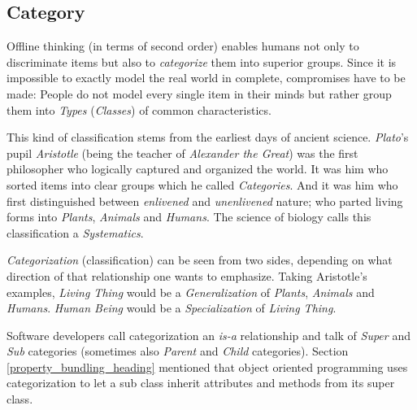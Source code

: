 %
%
%
%
%
%
%

\subsection{Category}
\label{category_heading}

Offline thinking (in terms of second order) enables humans not only to
discriminate items but also to \emph{categorize} them into superior groups.
Since it is impossible to exactly model the real world in complete, compromises
have to be made: People do not model every single item in their minds but rather
group them into \emph{Types} (\emph{Classes}) of common characteristics.

This kind of classification stems from the earliest days of ancient science.
\emph{Plato}'s pupil \emph{Aristotle} (being the teacher of \emph{Alexander the
Great}) was the first philosopher who logically captured and organized the world.
It was him who sorted items into clear groups which he called \emph{Categories}.
And it was him who first distinguished between \emph{enlivened} and
\emph{unenlivened} nature; who parted living forms into \emph{Plants},
\emph{Animals} and \emph{Humans}. The science of biology calls this classification
a \emph{Systematics}.

\emph{Categorization} (classification) can be seen from two sides, depending on
what direction of that relationship one wants to emphasize. Taking Aristotle's
examples, \emph{Living Thing} would be a \emph{Generalization} of \emph{Plants},
\emph{Animals} and \emph{Humans}. \emph{Human Being} would be a \emph{Specialization}
of \emph{Living Thing}.

Software developers call categorization an \emph{is-a} relationship and talk of
\emph{Super} and \emph{Sub} categories (sometimes also \emph{Parent} and
\emph{Child} categories). Section \ref{property_bundling_heading} mentioned that
object oriented programming uses categorization to let a sub class inherit
attributes and methods from its super class.
